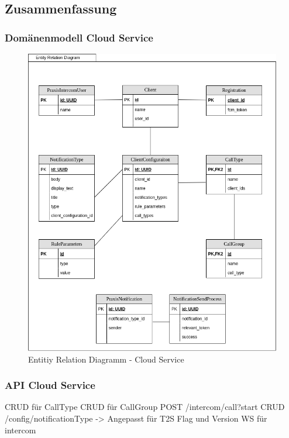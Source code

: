 \subsection{Zusammenfassung}

\subsubsection*{Domänenmodell Cloud Service}

\begin{figure}[h]
    \centering
    \begin{minipage}[b]{0.9\textwidth}
        \includegraphics[width=\textwidth]{graphics/diagramms/erd_v02}
        \caption{Entitiy Relation Diagramm - Cloud Service}
    \end{minipage}
\end{figure}

\clearpage

\subsubsection*{API Cloud Service}

CRUD für CallType
CRUD für CallGroup
POST /intercom/call?start
CRUD /config/notificationType -> Angepasst für T2S Flag und Version
WS für intercom


\clearpage
